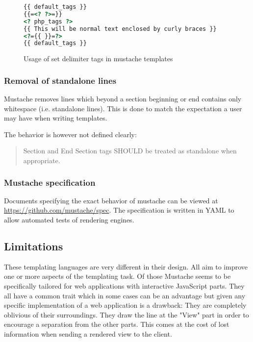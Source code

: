 \documentclass[thesis.tex]{subfiles}
\begin{document}
\begin{figure}
	\centering
	\caption{Usage of set delimiter tags in mustache templates}
	\label{fig:set-delim.mustache}
	\begin{lstlisting}[language=HTML]
{{ default_tags }}
{{=<? ?>=}}
<? php_tags ?>
{{ This will be normal text enclosed by curly braces }}
<?={{ }}=?>
{{ default_tags }}
	\end{lstlisting}
\end{figure}

\subsubsection{Removal of standalone lines}
\label{sec:standalone-lines}
Mustache removes lines which beyond a section beginning or end contains
only whitespace (i.e. standalone lines).
This is done to match the expectation a user may have when writing templates.

The behavior is however not defined clearly:
\begin{quote}
	Section and End Section tags SHOULD be treated as standalone when
	appropriate. \cite[sections.yml]{MSTSPEC}
\end{quote}

\subsubsection{Mustache specification}
Documents specifying the exact behavior of mustache can be viewed at
\url{https://github.com/mustache/spec}. The specification is written in YAML to
allow automated tests of rendering engines.

\subsection{Limitations}
These templating languages are very different in their design.
All aim to improve one or more aspects of the templating task.
Of those Mustache seems to be specifically tailored for web applications
with interactive JavaScript parts.
They all have a common trait which in some cases can be an advantage
but given any specific implementation of a web application is a drawback:
They are completely oblivious of their surroundings. They draw the line
at the "View" part in order to encourage a separation from the other
parts. This comes at the cost of lost information when sending a
rendered view to the client.
\end{document}
